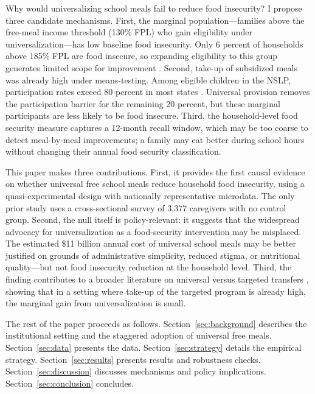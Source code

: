\documentclass[12pt]{article}
\begin{document}
Why would universalizing school meals fail to reduce food insecurity? I propose three candidate mechanisms. First, the marginal population---families above the free-meal income threshold (130\% FPL) who gain eligibility under universalization---has low baseline food insecurity. Only 6 percent of households above 185\% FPL are food insecure, so expanding eligibility to this group generates limited scope for improvement \citep{bartfeld2015food}. Second, take-up of subsidized meals was already high under means-testing. Among eligible children in the NSLP, participation rates exceed 80 percent in most states \citep{schwartz2020cost}. Universal provision removes the participation barrier for the remaining 20 percent, but these marginal participants are less likely to be food insecure. Third, the household-level food security measure captures a 12-month recall window, which may be too coarse to detect meal-by-meal improvements; a family may eat better during school hours without changing their annual food security classification.

This paper makes three contributions. First, it provides the first causal evidence on whether universal free school meals reduce household food insecurity, using a quasi-experimental design with nationally representative microdata. The only prior study \citep{andreyeva2023universal} uses a cross-sectional survey of 3,377 caregivers with no control group. Second, the null itself is policy-relevant: it suggests that the widespread advocacy for universalization as a food-security intervention may be misplaced. The estimated \$11 billion annual cost of universal school meals \citep{ruffini2022universal} may be better justified on grounds of administrative simplicity, reduced stigma, or nutritional quality---but not food insecurity reduction at the household level. Third, the finding contributes to a broader literature on universal versus targeted transfers \citep{finkelstein2019take, moffitt1983stigma, nichols2015stigma}, showing that in a setting where take-up of the targeted program is already high, the marginal gain from universalization is small.

The rest of the paper proceeds as follows. Section~\ref{sec:background} describes the institutional setting and the staggered adoption of universal free meals. Section~\ref{sec:data} presents the data. Section~\ref{sec:strategy} details the empirical strategy. Section~\ref{sec:results} presents results and robustness checks. Section~\ref{sec:discussion} discusses mechanisms and policy implications. Section~\ref{sec:conclusion} concludes.
\end{document}
